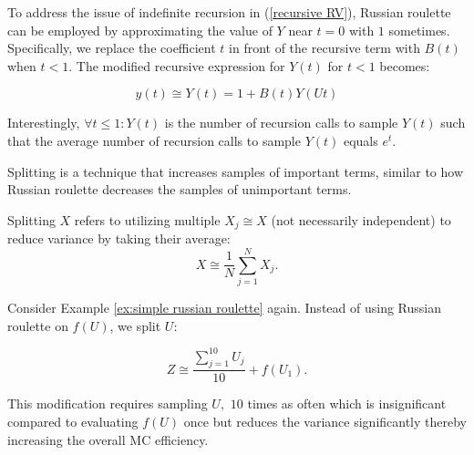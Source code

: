\documentclass[a4paper,12pt]{article}
\begin{document}
\begin{example} \label{ex: russian roulette}
  To address the issue of indefinite recursion in
  (\ref{recursive RV}), Russian roulette can be employed
  by approximating the value of $Y$ near $t = 0$ with $1$
  sometimes. Specifically, we replace the coefficient $t$
  in front of the recursive term with $B(t)$ when $t < 1$.
  The modified recursive expression for $Y(t)$ for $t<1$ becomes:

  \begin{equation}\label{eq:rr example}
    y(t) \cong Y(t) = 1 + B(t)Y(Ut)
  \end{equation}

  Interestingly, $\forall t \le 1:Y(t)$ is the number of recursion calls
  to sample $Y(t)$ such that the average number of recursion
  calls to sample $Y(t)$ equals $e^{t}$.

\end{example}

Splitting is a technique that increases samples of important terms, similar to how Russian roulette
decreases the samples of unimportant terms.

\begin{definition}[splitting] \label{def:splitting}
  Splitting $X$ refers to utilizing multiple $X_{j} \cong X$ (not necessarily independent) to
  reduce variance by taking their average:
  \begin{equation}
    X \cong \frac{1}{N} \sum_{j=1}^{N} X_{j}.
  \end{equation}
\end{definition}

\begin{example} \label{ex:simple splitting}
  Consider Example \ref{ex:simple russian roulette} again.
  Instead of using Russian roulette on $f(U)$, we split $U$:

  \begin{equation}
    Z \cong \frac{\sum_{j=1}^{10} U_j}{10} + f(U_{1}).
  \end{equation}

  This modification requires sampling $U,$
  $10$ times as often which is insignificant compared to evaluating $f(U)$ once
  but reduces the variance significantly thereby increasing the overall MC efficiency.\\
\end{example}
\end{document}
